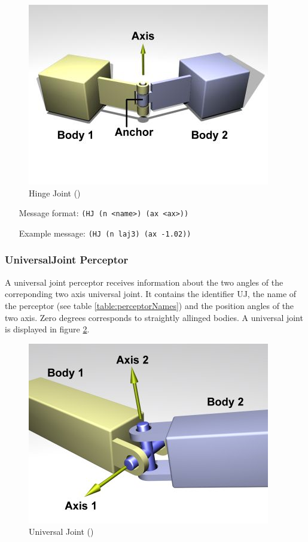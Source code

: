 \begin{figure}[htbp]
  \begin{center}
	\includegraphics[scale=0.6]{fig/HingeJoint.png}
    \caption{Hinge Joint (\cite{ODEManual})}
    \label{ode:hingejoint}
  \end{center}
\end{figure}
\begin{itemize}
	\item[Message format:] \texttt{(HJ (n <name>) (ax <ax>))}
	\item[Example message:] \texttt{(HJ (n laj3) (ax -1.02))}
\end{itemize}

\subsubsection{UniversalJoint Perceptor}
A universal joint perceptor receives information about the two angles of the
correponding two axis universal joint. It contains the identifier UJ, the name
of the perceptor (see table \ref{table:perceptorNames}) and the position angles of the two axis.
Zero degrees corresponds to straightly allinged bodies. A universal joint is
displayed in figure \ref{ode:universaljoint}. 
\begin{figure}[htbp]
  \begin{center}
	\includegraphics[scale=0.6]{fig/UniversalJoint.png}
    \caption{Universal Joint (\cite{ODEManual})}
    \label{ode:universaljoint}
  \end{center}
\end{figure}
 
